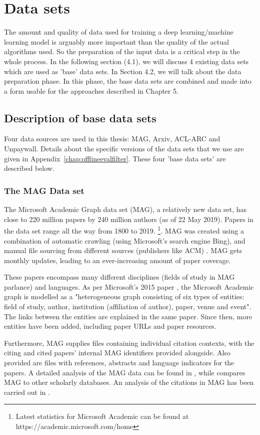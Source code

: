 \chapter{Data sets}\label{chap:dataset}

The amount and quality of data used for training a deep learning/machine learning model is arguably more important than the quality of the actual algorithms used. So the preparation of the input data is a critical step in the whole process. 
In the following section (4.1), we will discuss 4 existing data sets which are used as 'base' data sets. In Section 4.2, we will talk about the data preparation phase. In this phase, the base data sets are combined and made into a form usable for the approaches described in Chapter 5.

\section{Description of base data sets}
Four data sources are used in this thesis: MAG, Arxiv, ACL-ARC and Unpaywall. Details about the specific versions of the data sets that we use are given in Appendix~\ref{chap:offlineevalfilter}. These four 'base data sets' are described below.
\subsection{The MAG Data set}
The Microsoft Academic Graph data set (MAG), a relatively new data set, has close to 220 million papers by 240 million authors (as of 22 May 2019). Papers in the data set range all the way from 1800 to 2019. \footnote{Latest statistics for Microsoft Academic can be found at https://academic.microsoft.com/home}. MAG was created using a combination of automatic crawling (using Microsoft's search engine Bing), and manual file sourcing from different sources (publishers like ACM) \cite{Sinha2015}. MAG gets monthly updates, leading to an ever-increasing amount of paper coverage. 

These papers encompass many different disciplines (fields of study in MAG parlance) and languages. As per Microsoft's 2015 paper \cite{Sinha2015}, the Microsoft Academic graph is modelled as a "heterogeneous graph consisting of six types of entities: field of study, author, institution (affiliation of author), paper, venue and event". The links between the entities are explained in the same paper. Since then, more entities have been added, including paper URLs and paper resources.  

Furthermore, MAG supplies files containing individual citation contexts, with the citing and cited papers' internal MAG identifiers provided alongside. Also provided are files with references, abstracts and language indicators for the papers. A detailed analysis of the MAG data can be found in \cite{Herrmannova2016}, while \cite{Paszcza2016} compares MAG to other scholarly databases. An analysis of the citations in MAG has been carried out in \cite{Hug2017}. 


